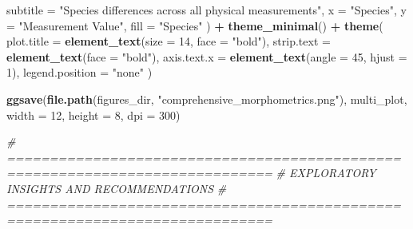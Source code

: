 \documentclass[
]{article}
\newenvironment{Shaded}{\begin{snugshade}}{\end{snugshade}}
\newcommand{\AttributeTok}[1]{\textcolor[rgb]{0.13,0.29,0.53}{#1}}
\newcommand{\CommentTok}[1]{\textcolor[rgb]{0.56,0.35,0.01}{\textit{#1}}}
\newcommand{\DecValTok}[1]{\textcolor[rgb]{0.00,0.00,0.81}{#1}}
\newcommand{\FunctionTok}[1]{\textcolor[rgb]{0.13,0.29,0.53}{\textbf{#1}}}
\newcommand{\NormalTok}[1]{#1}
\newcommand{\SpecialCharTok}[1]{\textcolor[rgb]{0.81,0.36,0.00}{\textbf{#1}}}
\newcommand{\StringTok}[1]{\textcolor[rgb]{0.31,0.60,0.02}{#1}}
\begin{document}
\begin{Shaded}
\begin{Highlighting}[]
    \AttributeTok{subtitle =} \StringTok{"Species differences across all physical measurements"}\NormalTok{,}
    \AttributeTok{x =} \StringTok{"Species"}\NormalTok{,}
    \AttributeTok{y =} \StringTok{"Measurement Value"}\NormalTok{,}
    \AttributeTok{fill =} \StringTok{"Species"}
\NormalTok{  ) }\SpecialCharTok{+}
  \FunctionTok{theme\_minimal}\NormalTok{() }\SpecialCharTok{+}
  \FunctionTok{theme}\NormalTok{(}
    \AttributeTok{plot.title =} \FunctionTok{element\_text}\NormalTok{(}\AttributeTok{size =} \DecValTok{14}\NormalTok{, }\AttributeTok{face =} \StringTok{"bold"}\NormalTok{),}
    \AttributeTok{strip.text =} \FunctionTok{element\_text}\NormalTok{(}\AttributeTok{face =} \StringTok{"bold"}\NormalTok{),}
    \AttributeTok{axis.text.x =} \FunctionTok{element\_text}\NormalTok{(}\AttributeTok{angle =} \DecValTok{45}\NormalTok{, }\AttributeTok{hjust =} \DecValTok{1}\NormalTok{),}
    \AttributeTok{legend.position =} \StringTok{"none"}
\NormalTok{  )}

\FunctionTok{ggsave}\NormalTok{(}\FunctionTok{file.path}\NormalTok{(figures\_dir, }\StringTok{"comprehensive\_morphometrics.png"}\NormalTok{),}
\NormalTok{       multi\_plot, }\AttributeTok{width =} \DecValTok{12}\NormalTok{, }\AttributeTok{height =} \DecValTok{8}\NormalTok{, }\AttributeTok{dpi =} \DecValTok{300}\NormalTok{)}

\CommentTok{\# =============================================================================}
\CommentTok{\# EXPLORATORY INSIGHTS AND RECOMMENDATIONS}
\CommentTok{\# =============================================================================}


\end{Highlighting}
\end{Shaded}
\end{document}
